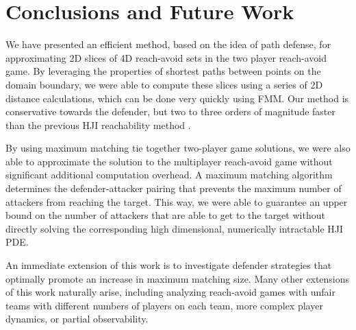 \section{Conclusions and Future Work} \label{sec:conc}
We have presented an efficient method, based on the idea of path defense, for approximating 2D slices of 4D reach-avoid sets in the two player reach-avoid game. By leveraging the properties of shortest paths between points on the domain boundary, we were able to compute these slices using a series of 2D distance calculations, which can be done very quickly using FMM. Our method is conservative towards the defender, but two to three orders of magnitude faster than the previous HJI reachability method \cite{Chen2014}.

By using maximum matching tie together two-player game solutions, we were also able to approximate the solution to the multiplayer reach-avoid game without significant additional computation overhead. A maximum matching algorithm determines the defender-attacker pairing that prevents the maximum number of attackers from reaching the target. This way, we were able to guarantee an upper bound on the number of attackers that are able to get to the target without directly solving the corresponding high dimensional, numerically intractable HJI PDE. 

An immediate extension of this work is to investigate defender strategies that optimally promote an increase in maximum matching size. Many other extensions of this work naturally arise, including analyzing reach-avoid games with unfair teams with different numbers of players on each team, more complex player dynamics, or partial observability. 